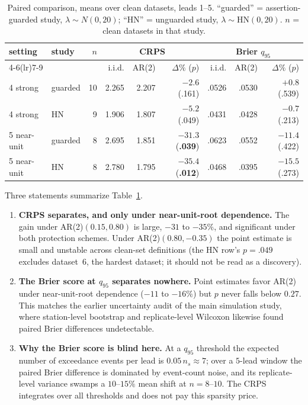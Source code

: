 \documentclass[11pt]{article}
\begin{document}
\begin{table}[ht]
\centering
\caption{Paired comparison, means over clean datasets, leads 1--5.
``guarded'' = assertion-guarded study, $\lambda \sim N(0,20)$;
``HN'' = unguarded study, $\lambda \sim \mathrm{HN}(0,20)$. $n$ = clean
datasets in that study.}
\label{tab:main}
\footnotesize
\begin{tabular}{llrrrrrrr}
\toprule
setting & study & $n$ & \multicolumn{3}{c}{CRPS} & \multicolumn{3}{c}{Brier $q_{95}$} \\
\cmidrule(lr){4-6}\cmidrule(lr){7-9}
 & & & i.i.d. & AR(2) & $\Delta\%$ ($p$) & i.i.d. & AR(2) & $\Delta\%$ ($p$) \\
\midrule
4 strong    & guarded & 10 & 2.265 & 2.207 & $-2.6$ (.161)  & .0526 & .0530 & $+0.8$ (.539) \\
4 strong    & HN      & 9  & 1.906 & 1.807 & $-5.2$ (.049)  & .0431 & .0428 & $-0.7$ (.213) \\
5 near-unit & guarded & 8  & 2.695 & 1.851 & $\mathbf{-31.3}$ (\textbf{.039}) & .0623 & .0552 & $-11.4$ (.422) \\
5 near-unit & HN      & 8  & 2.780 & 1.795 & $\mathbf{-35.4}$ (\textbf{.012}) & .0468 & .0395 & $-15.5$ (.273) \\
\bottomrule
\end{tabular}
\end{table}

Three statements summarize Table~\ref{tab:main}.

\begin{enumerate}\itemsep2pt
  \item \textbf{CRPS separates, and only under near-unit-root
        dependence.} The gain under AR(2)$(0.15,0.80)$ is large,
        $-31$ to $-35\%$, and significant under both protection
        schemes. Under
        AR(2)$(0.80,-0.35)$ the point estimate is small and unstable
        across clean-set definitions (the HN row's $p = .049$ excludes
        dataset~6, the hardest dataset; it should not be read as a
        discovery).
  \item \textbf{The Brier score at $q_{95}$ separates nowhere.} Point
        estimates favor AR(2) under near-unit-root dependence ($-11$ to
        $-16\%$) but $p$ never falls below $0.27$. This matches the
        earlier uncertainty audit of the main simulation study, where
        station-level bootstrap and replicate-level Wilcoxon likewise
        found paired Brier differences undetectable.
  \item \textbf{Why the Brier score is blind here.} At a $q_{95}$
        threshold the expected number of exceedance events per lead is
        $0.05\, n_s \approx 7$; over a $5$-lead window the paired Brier
        difference is dominated by event-count noise, and its
        replicate-level variance swamps a $10$--$15\%$ mean shift at
        $n = 8$--$10$. The CRPS integrates over all thresholds and does
        not pay this sparsity price.
\end{enumerate}
\end{document}

